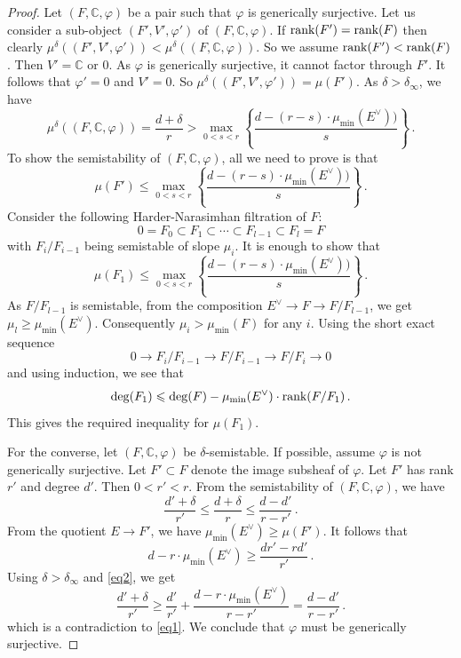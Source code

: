 \documentclass[11pt]{amsart}
\theoremstyle{remark}
\newcommand{\C}{\mathbb{C}}
\newcommand{\rk}{\textnormal{rank}}
\newcommand{\vp}[0]{\varphi}
\numberwithin{theorem}{section}
\begin{document}
    \begin{proof}
        Let $(F,\C,\vp)$ be a pair such that $\vp$ is generically surjective.
        Let us consider a sub-object $(F',V',\vp')$ of $(F,\C,\vp)$.
        If $\rk(F') = \rk(F)$ then clearly 
        $\mu^\delta((F',V',\vp')) < \mu^\delta((F,\C,\vp))$.
        So we assume $\rk(F') < \rk(F)$. Then $V' = \C$ or $0$.
        As $\vp$ is generically surjective, it cannot factor through $F'$.
        It follows that $\vp' = 0$ and $V'=0$.
        So $\mu^\delta((F',V',\vp')) = \mu(F')$.
        As $\delta > \delta_{\infty}$,
        we have $$\mu^\delta((F,\C,\vp)) = \frac{d+\delta}{r} > \max_{0<s<r} \left\{ \frac{d- (r-s) \cdot \mu_{\min}(E^\vee))}{s}
        \right\}\,.$$
        To show the semistability of $(F,\C,\vp)$, all we need to prove is that $$\mu(F') \leqslant \max_{0<s<r} \left\{ \frac{d- (r-s) \cdot \mu_{\min}(E^\vee))}{s}
        \right\}\,.$$
        Consider the following Harder-Narasimhan filtration of $F$:
        $$ 0 = F_0 \subset F_1 \subset \cdots \subset F_{l-1} \subset F_l = F$$
        with $F_i/F_{i-1}$ being semistable of slope $\mu_i$.
        It is enough to show that 
        $$\mu(F_1) \leqslant \max_{0<s<r}\left\{ \frac{d-(r-s) \cdot \mu_{\min}(E^\vee))}{s}
        \right\}\,.$$
        As $F/F_{l-1}$ is semistable, 
        from the composition $E^\vee \to F \to F/F_{l-1}$, we get 
        $\mu_l \geqslant \mu_{\min}(E^\vee)$.
        Consequently $\mu_i > \mu_{\min}(F)$ for any $i$.
        Using the short exact sequence 
        $$ 0 \to F_i/F_{i-1} \to F/F_{i-1} \to F/F_i \to 0$$
        and using induction, we see that 
        $$ \deg(F_1) \leqslant \deg(F) -\mu_{\min}(E^\vee) \cdot \rk(F/F_1)\,.$$
        This gives the required inequality for $\mu(F_1)$.

        For the converse, let $(F,\C,\vp)$ be $\delta$-semistable.
        If possible, assume $\vp$ is not generically surjective.
        Let $F' \subset F$ denote the image subsheaf of $\vp$.
        Let $F'$ has rank $r'$ and degree $d'$.
        Then $0 < r' < r$.
        From the semistability of $(F,\C,\vp)$, we have
        \begin{equation}\label{eq1}
            \frac{d'+\delta}{r'} \leqslant \frac{d+\delta}{r} \leqslant \frac{d-d'}{r-r'}\,.
        \end{equation}
        From the quotient $E \to F'$, we have 
        $\mu_{\min}(E^\vee) \geqslant \mu(F')$.
        It follows that 
        \begin{equation}\label{eq2}
            d - r \cdot \mu_{\min}(E^\vee) \geqslant \frac{dr'-rd'}{r'} \,.
        \end{equation}
        Using $\delta> \delta_{\infty}$ and \eqref{eq2}, 
        we get
        \begin{equation*}
            \frac{d'+\delta}{r'} \geqslant \frac{d'}{r'} + 
            \frac{d-r \cdot \mu_{\min}(E^\vee)}{r-r'}
            = \frac{d-d'}{r-r'}\,.
        \end{equation*}
        which is a contradiction to \eqref{eq1}.
        We conclude that $\vp$ must be generically surjective.
    \end{proof}
\end{document}
